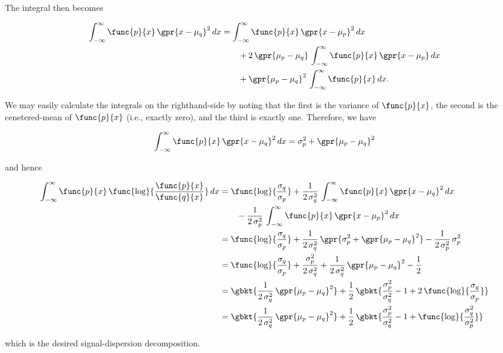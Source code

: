 The integral then becomes

\begin{align}
	\int_{-\infty}^{\infty} \func{p}{x}\,\gpr{x - \mu_q}^2\,dx &= \int_{-\infty}^{\infty} \func{p}{x}\,\gpr{x - \mu_p}^2\,dx \nonumber \\
			&\qquad + 2\,\gpr{\mu_p - \mu_q}\,\int_{-\infty}^{\infty} \func{p}{x}\,\gpr{x - \mu_p}\,dx \nonumber \\
			&\qquad + \gpr{\mu_p - \mu_q}^2\,\int_{-\infty}^{\infty} \func{p}{x}\,dx.
\end{align}

We may easily calculate the integrals on the righthand-side by noting that the first is the variance of $\func{p}{x}$, the second is the cenetered-mean of $\func{p}{x}$ (i.e., exactly zero), and the third is exactly one. Therefore, we have

\begin{equation}
	\int_{-\infty}^{\infty} \func{p}{x}\,\gpr{x - \mu_q}^2\,dx = \sigma_p^2 + \gpr{\mu_p - \mu_q}^2
\end{equation}

and hence

\begin{align}
	\int_{-\infty}^{\infty} \func{p}{x}\,\func{\log}{\frac{\func{p}{x}}{\func{q}{x}}}\,dx &= \func{\log}{\frac{\sigma_q}{\sigma_p}} + \frac{1}{2\,\sigma_q^2}\,\int_{-\infty}^{\infty} \func{p}{x}\,\gpr{x - \mu_q}^2\,dx \nonumber \\
			&\qquad - \frac{1}{2\,\sigma_p^2}\,\int_{-\infty}^{\infty} \func{p}{x}\,\gpr{x - \mu_p}^2\,dx \nonumber \\
		&= \func{\log}{\frac{\sigma_q}{\sigma_p}} + \frac{1}{2\,\sigma_q^2}\,\gpr{\sigma_p^2 + \gpr{\mu_p - \mu_q}^2} - \frac{1}{2\,\sigma_p^2}\,\sigma_p^2 \nonumber \\
		&= \func{\log}{\frac{\sigma_q}{\sigma_p}} + \frac{\sigma_p^2}{2\,\sigma_q^2} + \frac{1}{2\,\sigma_q^2}\,\gpr{\mu_p - \mu_q}^2 - \frac{1}{2} \nonumber \\
		&= \gbkt{\frac{1}{2\,\sigma_q^2}\,\gpr{\mu_p - \mu_q}^2} + \frac{1}{2}\,\gbkt{\frac{\sigma_p^2}{\sigma_q^2} - 1 + 2\,\func{\log}{\frac{\sigma_q}{\sigma_p}}} \nonumber \\
		&= \gbkt{\frac{1}{2\,\sigma_q^2}\,\gpr{\mu_p - \mu_q}^2} + \frac{1}{2}\,\gbkt{\frac{\sigma_p^2}{\sigma_q^2} - 1 + \func{\log}{\frac{\sigma_q^2}{\sigma_p^2}}}
\end{align}

which is the desired signal-dispersion decomposition.